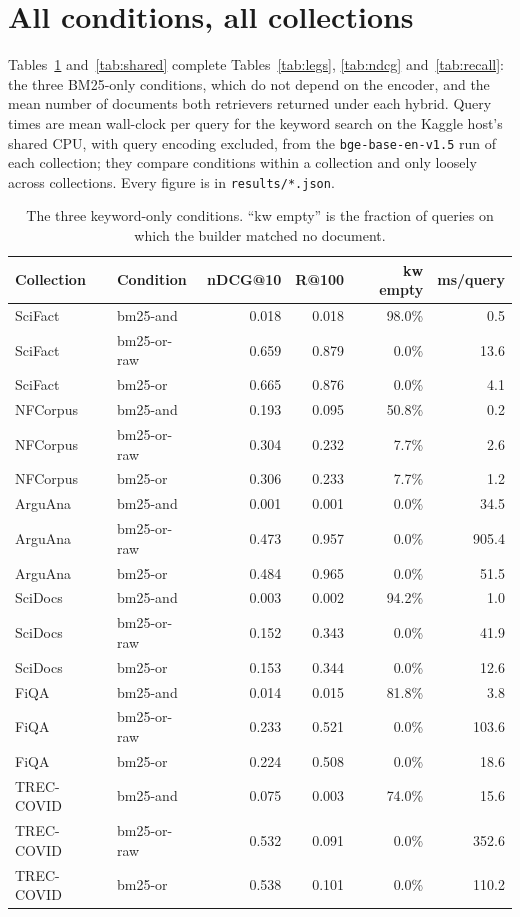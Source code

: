 \documentclass[11pt]{article}
\begin{document}



\appendix
\section{All conditions, all collections}
\label{app:full}

Tables~\ref{tab:bm25} and~\ref{tab:shared} complete Tables~\ref{tab:legs}, \ref{tab:ndcg} and~\ref{tab:recall}: the three BM25-only conditions, which do not depend on the encoder, and the mean number of documents both retrievers returned under each hybrid. Query times are mean wall-clock per query for the keyword search on the Kaggle host's shared CPU, with query encoding excluded, from the \texttt{bge-base-en-v1.5} run of each collection; they compare conditions within a collection and only loosely across collections. Every figure is in \texttt{results/*.json}.

\begin{table}[h]
\centering
\small
\begin{tabular}{llrrrr}
\toprule
Collection & Condition & nDCG@10 & R@100 & kw empty & ms/query \\
\midrule
SciFact & bm25-and & 0.018 & 0.018 & 98.0\% & 0.5 \\
SciFact & bm25-or-raw & 0.659 & 0.879 & 0.0\% & 13.6 \\
SciFact & bm25-or & 0.665 & 0.876 & 0.0\% & 4.1 \\
\midrule
NFCorpus & bm25-and & 0.193 & 0.095 & 50.8\% & 0.2 \\
NFCorpus & bm25-or-raw & 0.304 & 0.232 & 7.7\% & 2.6 \\
NFCorpus & bm25-or & 0.306 & 0.233 & 7.7\% & 1.2 \\
\midrule
ArguAna & bm25-and & 0.001 & 0.001 & 0.0\% & 34.5 \\
ArguAna & bm25-or-raw & 0.473 & 0.957 & 0.0\% & 905.4 \\
ArguAna & bm25-or & 0.484 & 0.965 & 0.0\% & 51.5 \\
\midrule
SciDocs & bm25-and & 0.003 & 0.002 & 94.2\% & 1.0 \\
SciDocs & bm25-or-raw & 0.152 & 0.343 & 0.0\% & 41.9 \\
SciDocs & bm25-or & 0.153 & 0.344 & 0.0\% & 12.6 \\
\midrule
FiQA & bm25-and & 0.014 & 0.015 & 81.8\% & 3.8 \\
FiQA & bm25-or-raw & 0.233 & 0.521 & 0.0\% & 103.6 \\
FiQA & bm25-or & 0.224 & 0.508 & 0.0\% & 18.6 \\
\midrule
TREC-COVID & bm25-and & 0.075 & 0.003 & 74.0\% & 15.6 \\
TREC-COVID & bm25-or-raw & 0.532 & 0.091 & 0.0\% & 352.6 \\
TREC-COVID & bm25-or & 0.538 & 0.101 & 0.0\% & 110.2 \\
\bottomrule
\end{tabular}
\caption{The three keyword-only conditions. ``kw empty'' is the fraction of queries on which the builder matched no document.}
\label{tab:bm25}
\end{table}
\end{document}
